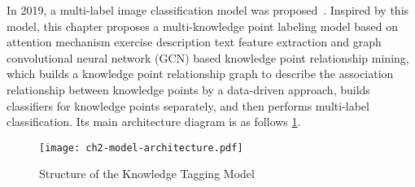 
In 2019, a multi-label image classification model was proposed~\cite{chen2019multi}. Inspired by this model, this chapter proposes a multi-knowledge point labeling model based on attention mechanism exercise description text feature extraction and graph convolutional neural network (GCN) based knowledge point relationship mining, which builds a knowledge point relationship graph to describe the association relationship between knowledge points by a data-driven approach, builds classifiers for knowledge points separately, and then performs multi-label classification. Its main architecture diagram is as follows \figurename{\ref{fig:ch2-modelarchitecture}}.

\begin{figure}[htbp!]
	\centering
	\texttt{[image: ch2-model-architecture.pdf]}
	\caption{Structure of the Knowledge Tagging Model}\label{fig:ch2-modelarchitecture}
\end{figure}




